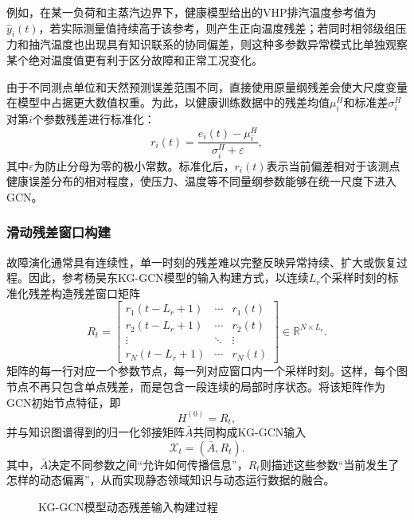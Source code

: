 例如，在某一负荷和主蒸汽边界下，健康模型给出的VHP排汽温度参考值为$\hat y_i(t)$，若实际测量值持续高于该参考，则产生正向温度残差；若同时相邻级组压力和抽汽温度也出现具有知识联系的协同偏差，则这种多参数异常模式比单独观察某个绝对温度值更有利于区分故障和正常工况变化。

由于不同测点单位和天然预测误差范围不同，直接使用原量纲残差会使大尺度变量在模型中占据更大数值权重。为此，以健康训练数据中的残差均值$\mu_i^{H}$和标准差$\sigma_i^{H}$对第$i$个参数残差进行标准化：
\begin{equation}
    r_i(t)=\frac{e_i(t)-\mu_i^{H}}{\sigma_i^{H}+\varepsilon},
\end{equation}
其中$\varepsilon$为防止分母为零的极小常数。标准化后，$r_i(t)$表示当前偏差相对于该测点健康误差分布的相对程度，使压力、温度等不同量纲参数能够在统一尺度下进入GCN。

\subsubsection{滑动残差窗口构建}

故障演化通常具有连续性，单一时刻的残差难以完整反映异常持续、扩大或恢复过程。因此，参考杨昊东KG-GCN模型的输入构建方式\cite{YangHaodong2026CFB}，以连续$L_r$个采样时刻的标准化残差构造残差窗口矩阵
\begin{equation}
    R_t=
    \begin{bmatrix}
    r_1(t-L_r+1) & \cdots & r_1(t)\\
    r_2(t-L_r+1) & \cdots & r_2(t)\\
    \vdots & \ddots & \vdots\\
    r_N(t-L_r+1) & \cdots & r_N(t)
    \end{bmatrix}
    \in\mathbb R^{N\times L_r}.
\end{equation}
矩阵的每一行对应一个参数节点，每一列对应窗口内一个采样时刻。这样，每个图节点不再只包含单点残差，而是包含一段连续的局部时序状态。将该矩阵作为GCN初始节点特征，即
\begin{equation}
    H^{(0)}=R_t,
\end{equation}
并与知识图谱得到的归一化邻接矩阵$\bar A$共同构成KG-GCN输入
\begin{equation}
    \mathcal X_t=(\bar A,R_t).
\end{equation}
其中，$\bar A$决定不同参数之间“允许如何传播信息”，$R_t$则描述这些参数“当前发生了怎样的动态偏离”，从而实现静态领域知识与动态运行数据的融合。

\begin{figure}[htbp]
    \centering
    \caption{KG-GCN模型动态残差输入构建过程}
    \label{fig:kg_gcn_input_v2}
\end{figure}


